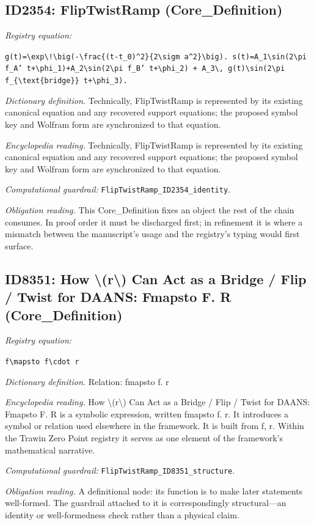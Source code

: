\documentclass[11pt]{article}
\theoremstyle{remark}
\begin{document}
\subsection{ID2354: FlipTwistRamp (Core\_Definition)}

\noindent\textit{Registry equation:}\par
{\small\texttt{g(t)=\textbackslash{}exp\textbackslash{}!\textbackslash{}big(-\textbackslash{}frac\{(t-t\_0)\textasciicircum{}2\}\{2\textbackslash{}sigm a\textasciicircum{}2\}\textbackslash{}big). s(t)=A\_1\textbackslash{}sin(2\textbackslash{}pi f\_A' t+\textbackslash{}phi\_1)+A\_2\textbackslash{}sin(2\textbackslash{}pi f\_B' t+\textbackslash{}phi\_2) + A\_3\textbackslash{}, g(t)\textbackslash{}sin(2\textbackslash{}pi f\_\{\textbackslash{}text\{bridge\}\} t+\textbackslash{}phi\_3).}}\par\medskip
\noindent\textit{Dictionary definition.} Technically, FlipTwistRamp is represented by its existing canonical equation and any recovered support equations; the proposed symbol key and Wolfram form are synchronized to that equation.\par\medskip
\noindent\textit{Encyclopedia reading.} Technically, FlipTwistRamp is represented by its existing canonical equation and any recovered support equations; the proposed symbol key and Wolfram form are synchronized to that equation.
\par\medskip\noindent\textit{Computational guardrail:} \texttt{FlipTwistRamp\_ID2354\_identity}.
\par\medskip\noindent\textit{Obligation reading.} This Core\_Definition fixes an object the rest of the chain consumes. In proof order it must be discharged first; in refinement it is where a mismatch between the manuscript's usage and the registry's typing would first surface.

\subsection{ID8351: How \textbackslash{}(r\textbackslash{}) Can Act as a Bridge / Flip / Twist for DAANS: Fmapsto F. R (Core\_Definition)}

\noindent\textit{Registry equation:}\par
{\small\texttt{f\textbackslash{}mapsto f\textbackslash{}cdot r}}\par\medskip
\noindent\textit{Dictionary definition.} Relation: fmapsto f. r\par\medskip
\noindent\textit{Encyclopedia reading.} How \textbackslash{}(r\textbackslash{}) Can Act as a Bridge / Flip / Twist for DAANS: Fmapsto F. R is a symbolic expression, written fmapsto f. r. It introduces a symbol or relation used elsewhere in the framework. It is built from f, r. Within the Trawin Zero Point registry it serves as one element of the framework's mathematical narrative.
\par\medskip\noindent\textit{Computational guardrail:} \texttt{FlipTwistRamp\_ID8351\_structure}.
\par\medskip\noindent\textit{Obligation reading.} A definitional node: its function is to make later statements well-formed. The guardrail attached to it is correspondingly structural---an identity or well-formedness check rather than a physical claim.
\end{document}
